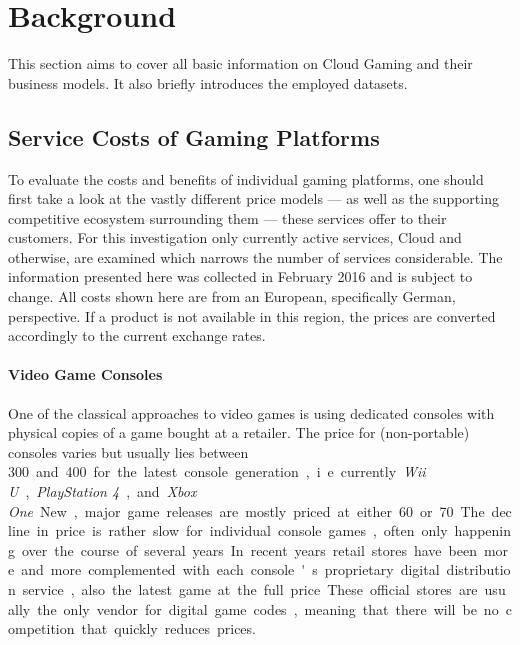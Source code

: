 \section{Background}
\label{sec:background}

This section aims to cover all basic information on Cloud Gaming and their business models. It also briefly introduces the employed datasets.

\subsection{Service Costs of Gaming Platforms}

To evaluate the costs and benefits of individual gaming platforms, one should first take a look at the vastly different price models --- as well as the supporting competitive ecosystem surrounding them --- these services offer to their customers. For this investigation only currently active services, Cloud and otherwise, are examined which narrows the number of services considerable. The information presented here was collected in February 2016 and is subject to change. All costs shown here are from an European, specifically German, perspective. If a product is not available in this region, the prices are converted accordingly to the current exchange rates.



\paragraph{Video Game Consoles}

One of the classical approaches to video games is using dedicated consoles with physical copies of a game bought at a retailer. The price for (non-portable) consoles varies but usually lies between \SI{300}[\EUR] and \SI{400}[\EUR] for the latest console generation, i.e. currently \textit{Wii U}, \textit{PlayStation 4}, and \textit{Xbox One}. New, major game releases are mostly priced at either \SI{60}[\EUR] or \SI{70}[\EUR]. The decline in price is rather slow for individual console games, often only happening over the course of several years.

In recent years retail stores have been more and more complemented with each console's proprietary digital distribution service, also the latest game at the full price. These official stores are usually the only vendor for digital game codes, meaning that there will be no competition that quickly reduces prices.

